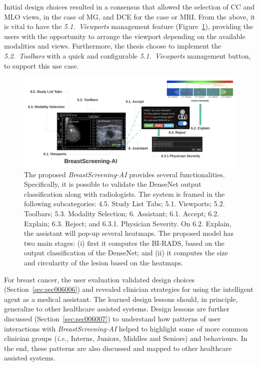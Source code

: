Initial design choices resulted in a consensus that allowed the selection of \ac{CC} and \ac{MLO} views, in the case of MG, 
and \ac{DCE} for the case or \ac{MRI}.
From the above, it is vital to have the \textit{5.1.~Viewports} management feature (Figure~\ref{fig:fig040}), providing the users with the opportunity to arrange the viewport depending on the available modalities and views.
Furthermore, the thesis choose to implement the \textit{5.2.~Toolbars} with a quick and configurable \textit{5.1.~Viewports} management button, to support this use case.

\begin{figure}[htbp]
\centering
\includegraphics[width=\textwidth]{images/fig040}
\caption{The proposed {\it BreastScreening-AI} provides several functionalities. Specifically, it is possible to validate the DenseNet output classification along with radiologists. The system is framed in the following subcategories: 4.5. Study List Tabs; 5.1. Viewports; 5.2. Toolbars; 5.3. Modality Selection; 6. Assistant; 6.1. Accept; 6.2. Explain; 6.3. Reject; and 6.3.1. Physician Severity. On 6.2. Explain, the assistant will pop-up several heatmaps. The proposed model has two main stages: (i)  first it computes the BI-RADS, based on the output classification of the DenseNet; and (ii) it computes the size and circularity of the lesion based on the heatmaps.}
\label{fig:fig040}
\end{figure}

For breast cancer, the user evaluation validated design choices (Section~\ref{sec:sec006006}) and revealed clinician strategies for using the intelligent agent as a medical assistant.
The learned design lessons should, in principle, generalize to other healthcare assisted systems.
Design lessons are further discussed (Section~\ref{sec:sec006007}) to understand how patterns of user interactions with {\it BreastScreening-AI} helped to highlight some of more common clinician groups ({\it i.e.}, Interns, Juniors, Middles and Seniors) and behaviours.
In the end, these patterns are also discussed and mapped to other healthcare assisted systems.

